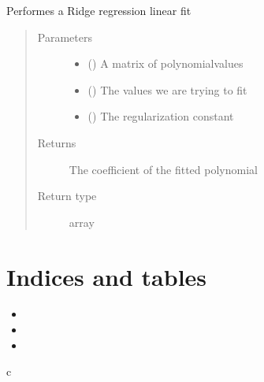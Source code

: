\documentclass[letterpaper,10pt,english]{sphinxmanual}
\begin{document}
\begin{fulllineitems}

\begin{fulllineitems}
\label{\detokenize{index:cls_reg.LinReg.ridge}}
Performes a Ridge regression linear fit
\begin{quote}\begin{description}
\item[{Parameters}] \leavevmode\begin{itemize}
\item {} 
 () \textendash{} A matrix of polynomialvalues

\item {} 
 () \textendash{} The values we are trying to fit

\item {} 
 (\sphinxstyleliteralemphasis{, }) \textendash{} The regularization constant

\end{itemize}

\item[{Returns}] \leavevmode
The coefficient of the fitted polynomial

\item[{Return type}] \leavevmode
array

\end{description}\end{quote}

\end{fulllineitems}


\end{fulllineitems}



\chapter{Indices and tables}
\label{\detokenize{index:indices-and-tables}}\label{\detokenize{index:welcome-to-linear-regression-s-documentation}}\begin{itemize}
\item {} 

\item {} 

\item {} 

\end{itemize}


\renewcommand{\indexname}{Python Module Index}
\begin{sphinxtheindex}
\def\bigletter#1{{\Large\sffamily#1}\nopagebreak\vspace{1mm}}
\bigletter{c}
\item {}
\end{sphinxtheindex}

\renewcommand{\indexname}{Index}
\printindex
\end{document}
